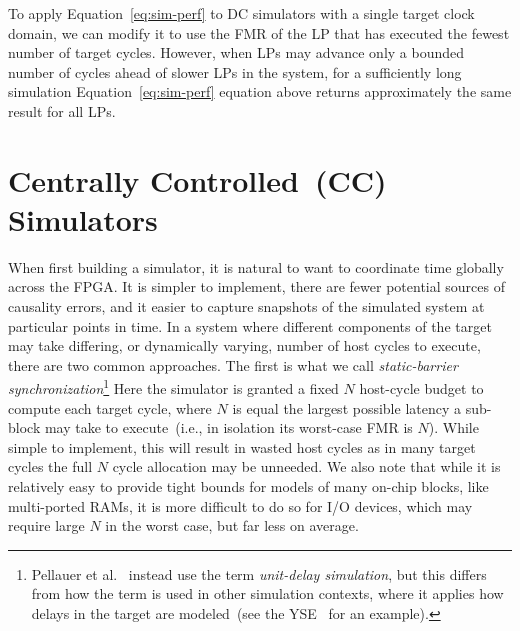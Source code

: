 To apply Equation~\ref{eq:sim-perf} to DC simulators with a single target clock domain, we can modify it to use
the FMR of the LP that has executed the fewest number of target cycles.
However, when LPs may advance only a bounded number of cycles
ahead of slower LPs in the system, for a sufficiently long simulation Equation~\ref{eq:sim-perf}
equation above returns approximately the same result for all LPs.

\section{Centrally Controlled~(CC) Simulators}

When first building a simulator, it is natural to want to coordinate time
globally across the FPGA. It is simpler to implement, there are fewer potential
sources of causality errors, and it easier to capture snapshots of the simulated system at particular points in
time. In a system where different components of the target may take differing,
or dynamically varying, number of host cycles to execute, there are two
common approaches.  The first is what we call \emph{static-barrier synchronization}\footnote{Pellauer et al.~\cite{APortNetworks}
instead use the term \emph{unit-delay simulation}, but this differs from how the term is used in other simulation contexts, where
it applies how delays in the target are modeled~(see the YSE~\cite{YSEHardware} for an example).}
Here the simulator is granted a fixed $N$ host-cycle budget to
compute each target cycle, where $N$ is equal the largest possible
latency a sub-block may take to execute~(i.e., in isolation its worst-case FMR is $N$). While simple to
implement, this will result in wasted host cycles as in many target cycles the
full $N$ cycle allocation may be unneeded.  We also note that while it is
relatively easy to provide tight bounds for models of many on-chip
blocks, like multi-ported RAMs, it is more difficult to do so for I/O devices, which may require large $N$
in the worst case, but far less on average.

